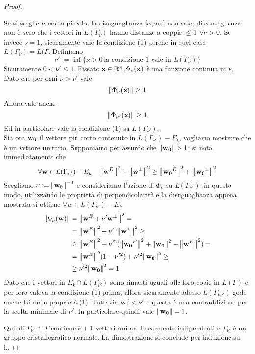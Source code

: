 \documentclass[a4paper,11pt,openright,twoside	]{book}
\begin{document}
\begin{proof}
\begin{itemize}
Se si sceglie $\nu$ molto piccolo, la disuguaglianza \ref{eq:nu}  non vale; di conseguenza non è vero che i vettori in  $L(\Gamma_{\nu})$ hanno distanze a coppie $\leq 1$ $\forall \nu >0$. Se invece $\nu = 1 $, sicuramente vale la condizione (1) perché in quel caso $L(\Gamma_{\nu}) = L(\Gamma $. 
Definiamo 
\[ \nu' := \inf \{\nu >0 | \textrm{la condizione 1 vale in }  L(\Gamma_{\nu}) \} \]
Sicuramente $0 < \nu' \leq 1$. Fissato $\vb{x} \in \mathbb{R}^n$,$\Phi_{\nu}(\vb{x}) $ è una funzione continua in $\nu$. \\
Dato che per ogni  $\nu > \nu ' $ vale 
\[ \norm{\Phi_{\nu}(\vb{x})} \geq 1 \]
Allora vale anche 
\[ \norm{\Phi_{\nu'}(\vb{x})} \geq 1  \]
Ed in particolare vale la condizione (1) su $L(\Gamma_{\nu'})$. \\
Sia ora $\vb{w_0}$ il vettore più corto contenuto in $L(\Gamma_{\nu'}) - E_k$, vogliamo mostrare che è un vettore unitario. 
Supponiamo per assurdo che $\norm{\vb{w_0}} > 1$; si nota immediatamente che 
\[ \forall \vb{w} \in L(\Gamma_{\nu'}) - E_k \; \; \; \; \norm{\vb{w}^E}^2 + \norm{\vb{w}^{\perp}}^2 \geq \norm{\vb{w_0}^E}^2 + \norm{\vb{w_0}^{\perp}}^2 \]
Scegliamo $\nu := \norm{\vb{w}_0}^{-1}$ e consideriamo l'azione di $\Phi_{\nu}$ su $L(\Gamma_{\nu'})$; in questo modo, utilizzando le proprietà di perpendicolarità e la disuguaglianza appena mostrata si ottiene $\forall w \in L(\Gamma_{\nu'}) - E_k$
\[ \begin{split}
\norm{\Phi_{\nu}(\vb{w})} & = \norm{\vb{w}^E  + \nu' \vb{w}^{\perp}}^2 = \\
 & =  \norm{\vb{w}^E}^2 + \nu'^2 \norm{\vb{w}^{\perp}}^2 \geq \\
 & \geq \norm{\vb{w}^E}^2 + \nu'^2 (\norm{\vb{w_0}^E}^2 + \norm{\vb{w_0}}^2 - \norm{\vb{w}^E}^2  ) = \\
 & = \norm{\vb{w}^E}^2 (1 - \nu'^2)   + \nu'^2 \norm{\vb{w_0}}^2 \geq \\
 & \geq \nu'^2  \norm{\vb{w_0}}^2 = 1 
\end{split}
\]
Dato che i vettori in $E_k \cap L(\Gamma_{\nu'})$ sono rimasti uguali alle loro copie in $L(\Gamma)$ e per loro valeva la condizione (1) prima, allora sicuramente adesso $L(\Gamma_{\nu \nu'})$ gode anche lui della proprietà (1). 
Tuttavia $\nu \nu'< \nu'$ e questa è una contraddizione per la scelta minimale di $\nu'$.
In particolare quindi vale $\norm{\vb{w_0}} = 1$. 
\end{itemize}
Quindi  $\Gamma_{\nu'} \cong \Gamma$ contiene $k+1$ vettori unitari linearmente indipendenti e $\Gamma_{\nu'}$ è un gruppo cristallografico normale.  
La dimostrazione si conclude per induzione su k. 
\end{proof}
\end{document}
